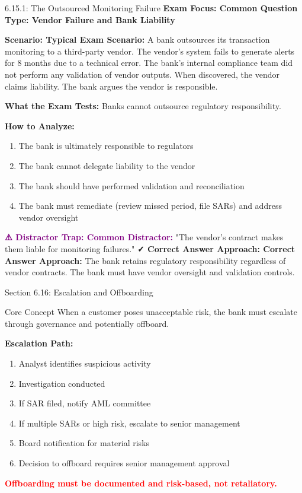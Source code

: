 \documentclass[11pt,a4paper]{beamer}
\newcommand{\redflag}[1]{\textcolor{red}{\textbf{#1}}}
\newcommand{\examfocus}[1]{\textcolor{orange!80!black}{\textbf{Exam Focus: #1}}}
\newcommand{\trap}[1]{\textcolor{purple}{\textbf{⚠️ Distractor Trap: #1}}}
\newcommand{\correct}[1]{\textcolor{green!50!black}{\textbf{✓ Correct Answer Approach: #1}}}
\newcommand{\scenario}[1]{\textcolor{blue!70!black}{\textbf{Scenario: #1}}}
\begin{document}
	\begin{frame}{6.15.1: The Outsourced Monitoring Failure}
		\examfocus{Common Question Type: Vendor Failure and Bank Liability}
		
		\scenario{Typical Exam Scenario:}
		A bank outsources its transaction monitoring to a third-party vendor. The vendor's system fails to generate alerts for 8 months due to a technical error. The bank's internal compliance team did not perform any validation of vendor outputs. When discovered, the vendor claims liability. The bank argues the vendor is responsible.
		
		\textbf{What the Exam Tests:} Banks cannot outsource regulatory responsibility.
		
		\textbf{How to Analyze:}
		\begin{enumerate}
			\item The bank is ultimately responsible to regulators
			\item The bank cannot delegate liability to the vendor
			\item The bank should have performed validation and reconciliation
			\item The bank must remediate (review missed period, file SARs) and address vendor oversight
		\end{enumerate}
		
		\trap{Common Distractor:} "The vendor's contract makes them liable for monitoring failures."
		\correct{Correct Answer Approach:} The bank retains regulatory responsibility regardless of vendor contracts. The bank must have vendor oversight and validation controls.
	\end{frame}
	
	
	\begin{frame}{Section 6.16: Escalation and Offboarding}
		\begin{block}{Core Concept}
			When a customer poses unacceptable risk, the bank must escalate through governance and potentially offboard.
		\end{block}
		\textbf{Escalation Path:}
		\begin{enumerate}
			\item Analyst identifies suspicious activity
			\item Investigation conducted
			\item If SAR filed, notify AML committee
			\item If multiple SARs or high risk, escalate to senior management
			\item Board notification for material risks
			\item Decision to offboard requires senior management approval
		\end{enumerate}
		\redflag{Offboarding must be documented and risk-based, not retaliatory.}
	\end{frame}
	
\end{document}
